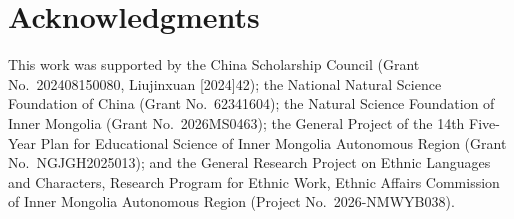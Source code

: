 






\section*{Acknowledgments}
This work was supported by the China Scholarship Council
(Grant No.~202408150080, Liujinxuan [2024]42); the National Natural
Science Foundation of China (Grant No.~62341604); the Natural Science
Foundation of Inner Mongolia (Grant No.~2026MS0463); the General
Project of the 14th Five-Year Plan for Educational Science of Inner
Mongolia Autonomous Region (Grant No.~NGJGH2025013); and the General
Research Project on Ethnic Languages and Characters, Research Program
for Ethnic Work, Ethnic Affairs Commission of Inner Mongolia Autonomous
Region (Project No.~2026-NMWYB038).





